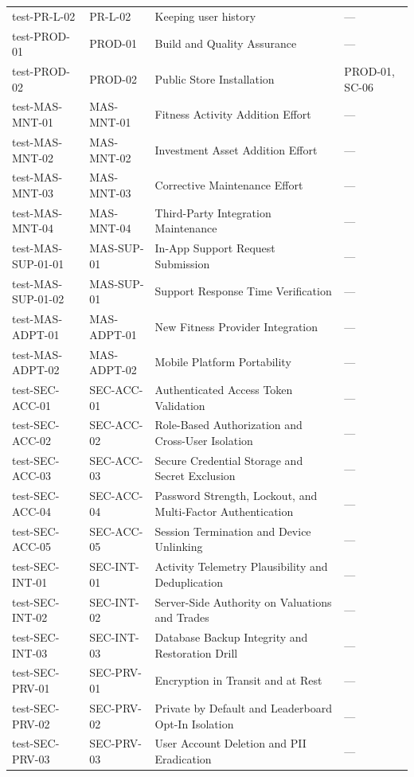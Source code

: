 \documentclass[12pt, titlepage]{article}
\begin{document}
\begin{xltabular}{\textwidth}{p{3cm}p{2.3cm}>{\raggedright\arraybackslash}X>{\raggedright\arraybackslash}p{2.4cm}}
  test-PR-L-02 & PR-L-02 & Keeping user history & ---\\
  test-PROD-01 & PROD-01 & Build and Quality Assurance & ---\\
  test-PROD-02 & PROD-02 & Public Store Installation & PROD-01, SC-06\\
  test-MAS-MNT-01 & MAS-MNT-01 & Fitness Activity Addition Effort & ---\\
  test-MAS-MNT-02 & MAS-MNT-02 & Investment Asset Addition Effort & ---\\
  test-MAS-MNT-03 & MAS-MNT-03 & Corrective Maintenance Effort & ---\\
  test-MAS-MNT-04 & MAS-MNT-04 & Third-Party Integration Maintenance & ---\\
  test-MAS-SUP-01-01 & MAS-SUP-01 & In-App Support Request Submission & ---\\
  test-MAS-SUP-01-02 & MAS-SUP-01 & Support Response Time Verification & ---\\
  test-MAS-ADPT-01 & MAS-ADPT-01 & New Fitness Provider Integration & ---\\
  test-MAS-ADPT-02 & MAS-ADPT-02 & Mobile Platform Portability & ---\\
  test-SEC-ACC-01 & SEC-ACC-01 & Authenticated Access Token Validation & ---\\
  test-SEC-ACC-02 & SEC-ACC-02 & Role-Based Authorization and Cross-User Isolation & ---\\
  test-SEC-ACC-03 & SEC-ACC-03 & Secure Credential Storage and Secret Exclusion & ---\\
  test-SEC-ACC-04 & SEC-ACC-04 & Password Strength, Lockout, and Multi-Factor Authentication & ---\\
  test-SEC-ACC-05 & SEC-ACC-05 & Session Termination and Device Unlinking & ---\\
  test-SEC-INT-01 & SEC-INT-01 & Activity Telemetry Plausibility and Deduplication & ---\\
  test-SEC-INT-02 & SEC-INT-02 & Server-Side Authority on Valuations and Trades & ---\\
  test-SEC-INT-03 & SEC-INT-03 & Database Backup Integrity and Restoration Drill & ---\\
  test-SEC-PRV-01 & SEC-PRV-01 & Encryption in Transit and at Rest & ---\\
  test-SEC-PRV-02 & SEC-PRV-02 & Private by Default and Leaderboard Opt-In Isolation & ---\\
  test-SEC-PRV-03 & SEC-PRV-03 & User Account Deletion and PII Eradication & ---\\

\end{xltabular}
\end{document}
